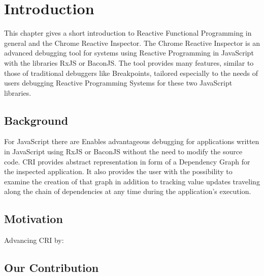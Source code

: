\chapter{Introduction} \label{ch:Introduction}
This chapter gives a short introduction to Reactive Functional Programming in general and the Chrome Reactive Inspector. The Chrome Reactive Inspector is an advanced debugging tool for systems using Reactive Programming in JavaScript with the libraries RxJS or BaconJS. The tool provides many features, similar to those of traditional debuggers like Breakpoints, tailored especially to the needs of users debugging Reactive Programming Systems for these two JavaScript libraries.

\section{Background}

For JavaScript there are 
Enables advantageous debugging for applications written in JavaScript using RxJS or BaconJS without the need to modify the source code.
CRI provides abstract representation in form of a Dependency Graph for the inspected application. It also provides the user with the possibility to examine the creation of that graph in addition to tracking value updates traveling along the chain of dependencies at any time during the application's execution.%

\section{Motivation}
Advancing CRI by:


\section{Our Contribution}

